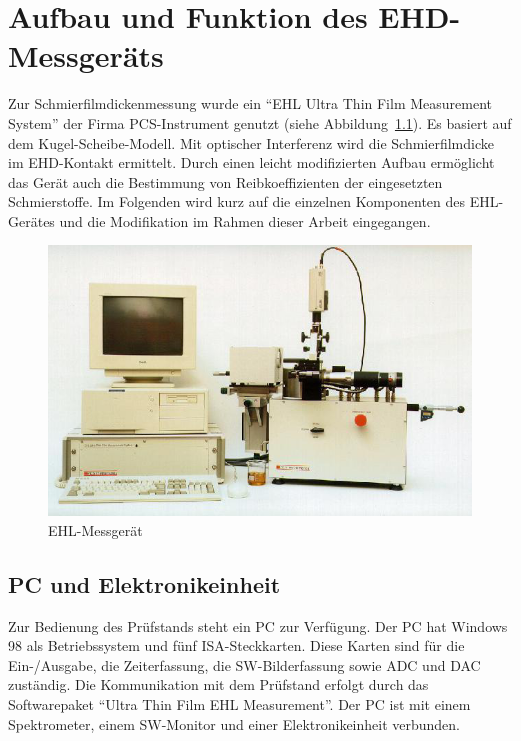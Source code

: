 \chapter{Aufbau und Funktion des EHD-Messgeräts}
\label{chap:aufbau_und_funktion_des_ehd_messgeraets}

Zur Schmierfilmdickenmessung wurde ein ``EHL Ultra Thin Film Measurement System'' der Firma PCS-Instrument genutzt (siehe Abbildung~\ref{fig:ehl_messgeraet}).
Es basiert auf dem Kugel-Scheibe-Modell.
Mit optischer Interferenz wird die Schmierfilmdicke im EHD-Kontakt ermittelt.
Durch einen leicht modifizierten Aufbau ermöglicht das Gerät auch die Bestimmung von Reibkoeffizienten der eingesetzten Schmierstoffe.
Im Folgenden wird kurz auf die einzelnen Komponenten des EHL-Gerätes und die Modifikation im Rahmen dieser Arbeit eingegangen.

\begin{figure}[htb]
    \centering
    \includegraphics[width=0.8\linewidth]{./images/ehl_pruefstand.png}
    \caption{EHL-Messgerät~\cite{ehl}}
    \label{fig:ehl_messgeraet}
\end{figure}

\section{PC und Elektronikeinheit}
\label{sec:pc_elektronikeinheit}

Zur Bedienung des Prüfstands steht ein PC zur Verfügung.
Der PC hat Windows 98 als Betriebssystem und fünf ISA-Steckkarten.
Diese Karten sind für die Ein-/Ausgabe, die Zeiterfassung, die SW-Bilderfassung sowie ADC und DAC zuständig.
Die Kommunikation mit dem Prüfstand erfolgt durch das Softwarepaket ``Ultra Thin Film EHL Measurement''.
Der PC ist mit einem Spektrometer, einem SW-Monitor und einer Elektronikeinheit verbunden.

